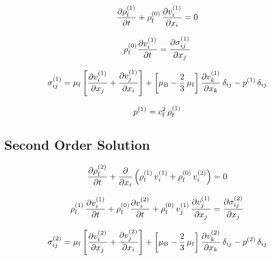 \begin{equation}
  \pdv{  \rho_{\mathrm{f}}^{(1)}  }{t} + \rho_{\mathrm{f}}^{(0)}\,\pdv{  v_{i}^{(1)}  }{x_{i}} = 
  0
  \label{eq:Th-st-massconservatio}
\end{equation}

\begin{equation}
  \rho_{\mathrm{f}}^{(0)} \pdv{  v_{i}^{(1)}  }{t} = \pdv{  \sigma_{ij}^{(1)}  }{x_{j}}
  \label{eq:Th-st-navier}
\end{equation}

\begin{equation}
  \sigma_{ij}^{(1)} = \mu_{\mathrm{f}}\left[ \pdv{  v_{i}^{(1)}  }{x_{j}} + 
  \pdv{  v_{j}^{(1)}  }{x_{i}} \right] + \left[ \mu_{\mathrm{B}} - 
  \frac{2}{3}\,\mu_{\mathrm{f}} \right] \pdv{  v_{k}^{(1)}  }{x_{k}} \,\delta_{ij} - 
  p^{(1)}\,\delta_{ij}
  \label{eq:Th-st-stress}
\end{equation}

\begin{equation}
  p^{(1)} = c_{\mathrm{f}}^{2}\,\rho_{\mathrm{f}}^{(1)}
  \label{eq:Th-st-pre}
\end{equation}



\subsection{Second Order Solution\label{sec:Th-secondorder}}

\begin{equation}
  \pdv{  \rho_{\mathrm{f}}^{(2)}  }{t} + 
  \pdv{x_{i}}\left(\rho_{\mathrm{f}}^{(1)}\,v_{i}^{(1)} + 
  \rho_{\mathrm{f}}^{(0)}\,v_{i}^{(2)} \right) = 0
  \label{eq:Th-nd-massconservatio}
\end{equation}

\begin{equation}
  \rho_{\mathrm{f}}^{(1)}\,\pdv{  v_{i}^{(1)}  }{t} + \rho_{\mathrm{f}}^{(0)} 
  \pdv{  v_{i}^{(2)}  }{t} + 
  \rho_{\mathrm{f}}^{(0)}\,v_{j}^{(1)}\,\pdv{  v_{j}^{(1)}  }{x_{j}} = 
  \pdv{  \sigma_{ij}^{(2)}  }{x_{j}}
  \label{eq:Th-nd-navier}
\end{equation}

\begin{equation}
  \sigma_{ij}^{(2)} = \mu_{\mathrm{f}}\left[ \pdv{  v_{i}^{(2)}  }{x_{j}} + 
  \pdv{  v_{j}^{(2)}  }{x_{i}} \right] + \left[ \mu_{\mathrm{B}} - 
  \frac{2}{3}\,\mu_{\mathrm{f}} \right] \pdv{  v_{k}^{(2)}  }{x_{k}} \,\delta_{ij} - 
  p^{(2)}\,\delta_{ij}
  \label{eq:Th-nd-stress}
\end{equation}


